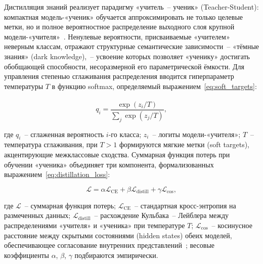 Дистилляция знаний реализует парадигму «учитель~– ученик» (Teacher-Student): компактная модель-«ученик» обучается аппроксимировать не только целевые метки, но и полное вероятностное распределение выходного слоя крупной модели-«учителя»~\cite{xu2024distillation}. Ненулевые вероятности, присваиваемые «учителем» неверным классам, отражают структурные семантические зависимости~– «тёмные знания» (dark knowledge),~– усвоение которых позволяет «ученику» достигать обобщающей способности, несоразмерной его параметрической ёмкости. Для управления степенью сглаживания распределения вводится гиперпараметр температуры $T$ в функцию softmax, определяемый выражением~\eqref{eq:soft_targets}:
\\\\

\begin{equation}
    q_i = \frac{\exp(z_i / T)}{\sum_j \exp(z_j / T)},
    \label{eq:soft_targets}
\end{equation}

\noindent где $q_i$~– сглаженная вероятность $i$-го класса; $z_i$~– логиты модели-«учителя»; $T$~– температура сглаживания, при $T > 1$ формируются мягкие метки (soft targets), акцентирующие межклассовые сходства. Суммарная функция потерь при обучении «ученика» объединяет три компонента, формализованных выражением~\eqref{eq:distillation_loss}:

\begin{equation}
    \mathcal{L} = \alpha \mathcal{L}_{\mathrm{CE}} + \beta \mathcal{L}_{\mathrm{distill}} + \gamma \mathcal{L}_{\mathrm{cos}},
    \label{eq:distillation_loss}
\end{equation}

\noindent где $\mathcal{L}$~– суммарная функция потерь; $\mathcal{L}_{\mathrm{CE}}$~– стандартная кросс-энтропия на размеченных данных; $\mathcal{L}_{\mathrm{distill}}$~– расхождение Кульбака~– Лейблера между распределениями «учителя» и «ученика» при температуре $T$; $\mathcal{L}_{\mathrm{cos}}$~– косинусное расстояние между скрытыми состояниями (hidden states) обеих моделей, обеспечивающее согласование внутренних представлений~\cite{sanh2019distilbert}; весовые коэффициенты $\alpha$, $\beta$, $\gamma$ подбираются эмпирически.

